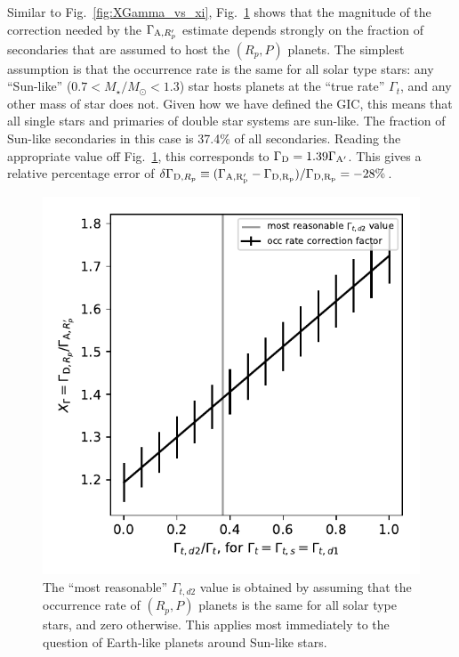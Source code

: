 \documentclass{emulateapj}
\begin{document}
Similar to Fig.~\ref{fig:XGamma_vs_xi}, Fig.~\ref{fig:error_vs_occrate} 
shows that the magnitude of the correction needed by the $\Gamma_{{\rm 
A},R_p'}$ estimate depends strongly 
on the fraction of secondaries that are assumed to host the $(R_p, P)$ planets.
The simplest assumption is that the occurrence rate is the same for all solar 
type stars: any ``Sun-like'' ($0.7<M_\star/M_\odot<1.3$) star hosts planets at 
the ``true rate'' $\Gamma_t$, and any other mass of star does not.
Given how we have defined the GIC, this means that all single stars and 
primaries of double star systems are sun-like. The fraction of Sun-like 
secondaries in this case is 37.4\% of all secondaries.
Reading the appropriate value off Fig.~\ref{fig:error_vs_occrate}, this 
corresponds to $\Gamma_{\rm D} = 1.39 \Gamma_{\rm A'}$.
This gives a relative percentage error of $\delta\Gamma_{{\rm D},R_p} \equiv 
(\Gamma_{\rm A,R_p'} - \Gamma_{\rm D,R_p}) / \Gamma_{\rm D,R_p} = -28\%$.


\begin{figure}[!t]
	\begin{center}
		\includegraphics[scale=0.8]{figures/error_vs_occrate.pdf}
	\end{center}
	\caption{ The ``most reasonable'' $\Gamma_{t,d2}$ value is obtained by 
	assuming that the occurrence rate of $(R_p, P)$ planets is the same for all 
	solar type stars, and zero otherwise.
	This applies most immediately to the question of Earth-like planets around 
	Sun-like stars.
	}
	\label{fig:error_vs_occrate}
\end{figure}
\end{document}
